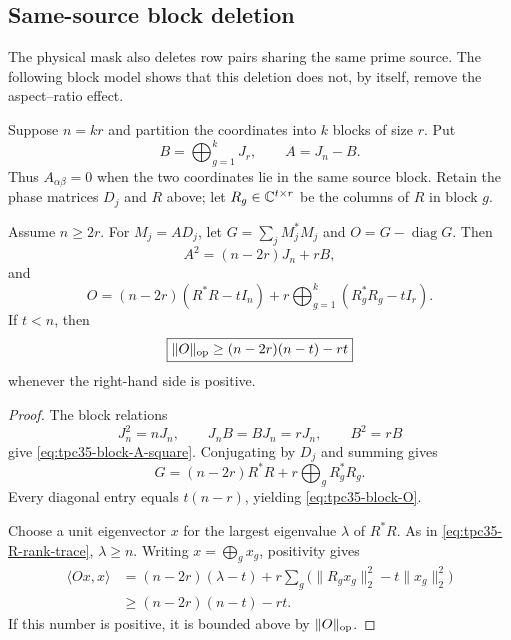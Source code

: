\subsection{Same-source block deletion}

The physical mask also deletes row pairs sharing the same prime source.
The following block model shows that this deletion does not, by itself,
remove the aspect--ratio effect.

Suppose \(n=kr\) and partition the coordinates into \(k\) blocks of size
\(r\).  Put
\begin{equation}
 B=\bigoplus_{g=1}^kJ_r,
 \qquad A=J_n-B.
 \label{eq:tpc35-block-deletion-A}
\end{equation}
Thus \(A_{\alpha\beta}=0\) when the two coordinates lie in the same
source block.  Retain the phase matrices \(D_j\) and \(R\) above; let
\(R_g\in\mathbb C^{t\times r}\) be the columns of \(R\) in block \(g\).

\begin{theorem}
\label{thm:tpc35-block-Gram}
Assume \(n\ge2r\).  For \(M_j=AD_j\), let
\(G=\sum_jM_j^*M_j\) and \(O=G-\operatorname{diag}G\).  Then
\begin{equation}
 A^2=(n-2r)J_n+rB,
 \label{eq:tpc35-block-A-square}
\end{equation}
and
\begin{equation}
 \boxed{
 O=(n-2r)(R^*R-tI_n)
 +r\bigoplus_{g=1}^k(R_g^*R_g-tI_r).}
 \label{eq:tpc35-block-O}
\end{equation}
If \(t<n\), then
\begin{equation}
 \boxed{
 \|O\|_{\operatorname{op}}
 \ge (n-2r)(n-t)-rt}
 \label{eq:tpc35-block-op-lower}
\end{equation}
whenever the right-hand side is positive.
\end{theorem}

\begin{proof}
The block relations
\[
 J_n^2=nJ_n,\qquad J_nB=BJ_n=rJ_n,\qquad B^2=rB
\]
give \eqref{eq:tpc35-block-A-square}.  Conjugating by \(D_j\) and
summing gives
\[
 G=(n-2r)R^*R+r\bigoplus_gR_g^*R_g.
\]
Every diagonal entry equals \(t(n-r)\), yielding
\eqref{eq:tpc35-block-O}.

Choose a unit eigenvector \(x\) for the largest eigenvalue \(\lambda\) of
\(R^*R\).  As in \eqref{eq:tpc35-R-rank-trace}, \(\lambda\ge n\).
Writing \(x=\bigoplus_gx_g\), positivity gives
\begin{align*}
 \langle Ox,x\rangle
 &=(n-2r)(\lambda-t)
 +r\sum_g\bigl(\|R_gx_g\|_2^2-t\|x_g\|_2^2\bigr)\\
 &\ge(n-2r)(n-t)-rt.
\end{align*}
If this number is positive, it is bounded above by \(\|O\|_{\operatorname{op}}\).
\end{proof}

